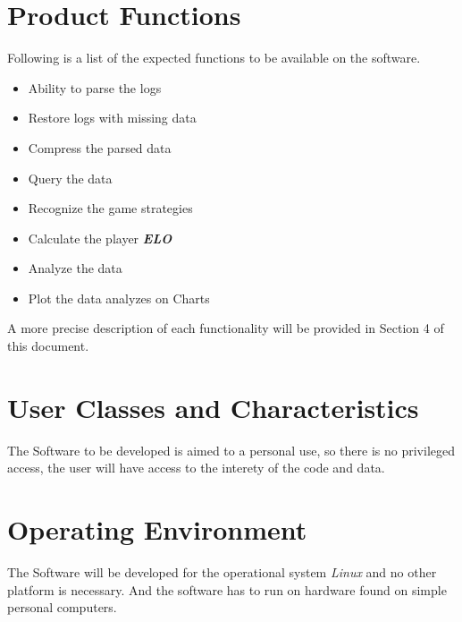 \documentclass{scrreprt}
\begin{document}
\section{Product Functions}
Following is a list of the expected functions to be available on the software.
\begin{itemize}
  \item{Ability to parse the logs}
  \item{Restore logs with missing data}
  \item{Compress the parsed data }
  \item{Query the data }
  \item{Recognize the game strategies}
  \item{Calculate the player \textit{\textbf{ELO}}}
  \item{Analyze the data}
  \item{Plot the data analyzes on Charts}
\end{itemize}
A more precise description of each functionality will be provided in Section 4 of this document.






\section{User Classes and Characteristics}
The Software to be developed is aimed to a personal use, so there is no privileged access, the user will have access to the interety of the code and data.
\section{Operating Environment}
The Software will be developed for the operational system \textit{Linux} and no
other platform is necessary.
And the software has to run on hardware found on simple personal computers.
\end{document}
